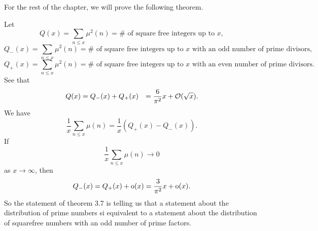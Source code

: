\documentclass[12pt]{article}
\begin{document}
For the rest of the chapter, we will prove the following theorem.
\begin{remark}
    Let 
    \[
        Q(x)=\sum_{n\leq x}\mu^2(n)=\# \text{ of square free integers up to } x,
    \]
    \[
        Q_-(x)=\sum_{n\leq x}\mu^2(n)=\# \text{ of square free integers up to } x \text{ with an odd number of prime divisors},
    \]
    \[
        Q_+(x)=\sum_{n\leq x}\mu^2(n)=\# \text{ of square free integers up to } x \text{ with an even number of prime divisors}.
    \]
    See that
    \begin{align*}
        Q(x)&=Q_-(x)+Q_+(x)
        &=\frac{6}{\pi^2}x+\mathcal{O}(\sqrt{x}).
    \end{align*}
    We have 
    \[
        \frac{1}{x}\sum_{n\leq x}\mu(n)=\frac{1}{x}\left(Q_+(x)-Q_-(x)\right).
    \]
    If 
    \[
        \frac{1}{x}\sum_{n\leq x}\mu(n)\to0
    \]
    as $x\to\infty$, then
    \[
        Q_-(x)=Q_+(x)+\text{o}(x)=\frac{3}{\pi^2}x+\text{o}(x).
    \]
    So the statement of theorem 3.7 is telling us that a statement about the distribution of prime numbers si equivalent to a statement about the distribution of squarefree numbers with an odd number of prime factors.
\end{remark}
\end{document}
